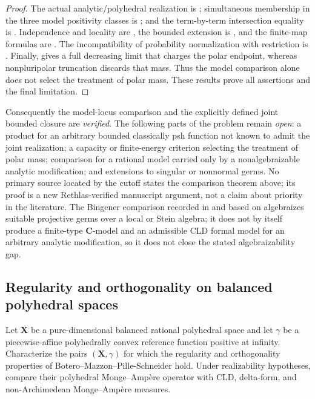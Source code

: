 \begin{proof}
The actual analytic/polyhedral realization is
; simultaneous membership in the three
model positivity classes is
; and the term-by-term
intersection equality is
.  Independence and locality
are , the bounded extension is
, and the finite-map formulas
are .  The incompatibility of
probability normalization with restriction is
.  Finally,
 gives a full decreasing limit that
charges the polar endpoint, whereas nonpluripolar truncation discards that
mass.  Thus the model comparison alone does not select the treatment of polar
mass.  These results prove all assertions and the final limitation.
\end{proof}

Consequently the model-locus comparison and the explicitly defined joint
bounded closure are \emph{verified}.  The following parts of the problem
remain \emph{open}: a product for an arbitrary
bounded classically psh function not known to admit the joint realization; a
capacity or finite-energy criterion selecting the treatment of polar mass;
comparison for a rational model carried only by a nonalgebraizable analytic
modification; and extensions to singular or nonnormal germs.  No primary
source located by the cutoff states the comparison theorem above; its proof
is a new Rethlas-verified manuscript argument, not a claim about priority in
the literature.  The Bingener comparison recorded in
 and based on
\cite[Aussage~2.8]{Bingener76Stein} algebraizes suitable projective germs over
a local or Stein algebra; it does not by itself produce a finite-type
\(\mathbf C\)-model and an admissible CLD formal model for an arbitrary
analytic modification, so it does not close the stated algebraizability gap.

\subsection{Regularity and orthogonality on balanced polyhedral spaces}

\begin{problem}\label{prob:frontier-polyhedral-regularity}
Let \(\mathbf X\) be a pure-dimensional balanced rational polyhedral space
and let \(\gamma\) be a piecewise-affine polyhedrally convex reference
function positive at infinity.  Characterize the pairs
\((\mathbf X,\gamma)\) for which the
regularity and orthogonality properties of Botero--Mazzon--Pille-Schneider
hold.  Under realizability hypotheses, compare their polyhedral
Monge--Amp\`ere operator with CLD, delta-form, and non-Archimedean
Monge--Amp\`ere measures.
\end{problem}

